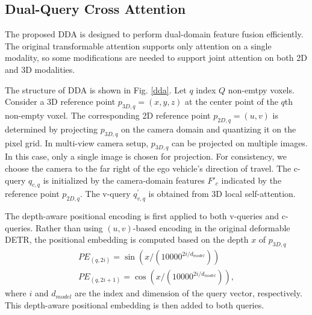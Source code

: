 \documentclass[lettersize,journal]{IEEEtran}
\begin{document}
\subsection{Dual-Query Cross Attention}
The proposed DDA is designed to perform dual-domain feature fusion efficiently. The original transformable attention \cite{def-detr} supports only attention on a single modality, so some modifications are needed to support joint attention on both 2D and 3D modalities. 

The structure of DDA is shown in Fig. \ref{dda}. Let $q$ index $Q$ non-emtpy voxels. Consider a 3D reference point $p_{3D,q}=(x,y,z)$ at the center point of the $q$th non-empty voxel. The corresponding 2D reference point $p_{2D,q}=(u,v)$  is determined by projecting $p_{3D,q}$ on the camera domain and quantizing it on the pixel grid. In multi-view camera setup, $p_{3D,q}$ can be projected on multiple images. In this case, only a single image is chosen for projection. For consistency, we choose the camera to the far right of the ego vehicle's direction of travel.
The c-query $q_{c,q}$ is initialized by the camera-domain features $F'_c$ indicated by the reference point $p_{2D,q}$. The v-query $q^{\prime}_{v,q}$ is obtained from 3D local self-attention. 

The depth-aware positional encoding is first applied to both v-queries and c-queries. Rather than using $(u,v)$-based encoding in the original deformable DETR, the positional embedding is computed based on the depth $x$ of $p_{3D,q}$ 
\begin{align}
PE_{(q,2i)}=\sin(x/(10000^{2i/d_{model}})) \\
PE_{(q,2i+1)}=\cos(x/(10000^{2i/d_{model}})),
\end{align}
where  $i$ and $d_{model}$ are the index and dimension of the query vector, respectively. This depth-aware positional embedding is then added to both queries. 
\end{document}

